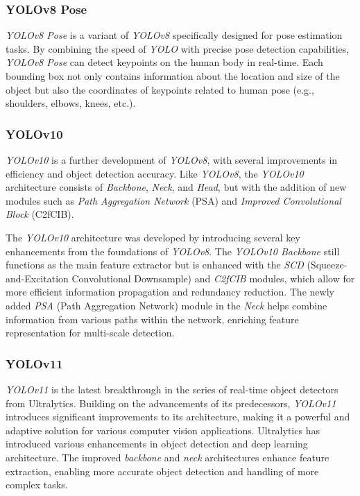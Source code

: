 \subsubsection{YOLOv8 Pose}
\label{subsubsec: YOLOv8 Pose}

\emph{YOLOv8 Pose} is a variant of \emph{YOLOv8} specifically designed for pose estimation tasks. By combining the speed of \emph{YOLO} with precise pose detection capabilities, \emph{YOLOv8 Pose} can detect keypoints on the human body in real-time. Each bounding box not only contains information about the location and size of the object but also the coordinates of keypoints related to human pose (e.g., shoulders, elbows, knees, etc.).

\subsubsection{YOLOv10}
\label{subsubsec:YOLOv10}

\emph{YOLOv10} is a further development of \emph{YOLOv8}, with several improvements in efficiency and object detection accuracy. Like \emph{YOLOv8}, the \emph{YOLOv10} architecture consists of \emph{Backbone}, \emph{Neck}, and \emph{Head}, but with the addition of new modules such as \emph{Path Aggregation Network} (PSA) and \emph{Improved Convolutional Block} (C2fCIB).

The \emph{YOLOv10} architecture was developed by introducing several key enhancements from the foundations of \emph{YOLOv8}. The \emph{YOLOv10 Backbone} still functions as the main feature extractor but is enhanced with the \emph{SCD} (Squeeze-and-Excitation Convolutional Downsample) and \emph{C2fCIB} modules, which allow for more efficient information propagation and redundancy reduction. The newly added \emph{PSA} (Path Aggregation Network) module in the \emph{Neck} helps combine information from various paths within the network, enriching feature representation for multi-scale detection.

\subsubsection{YOLOv11}
\label{subsubsec:YOLOv11}

\emph{YOLOv11} is the latest breakthrough in the series of real-time object detectors from Ultralytics. Building on the advancements of its predecessors, \emph{YOLOv11} introduces significant improvements to its architecture, making it a powerful and adaptive solution for various computer vision applications. Ultralytics has introduced various enhancements in object detection and deep learning architecture. The improved \emph{backbone} and \emph{neck} architectures enhance feature extraction, enabling more accurate object detection and handling of more complex tasks.

